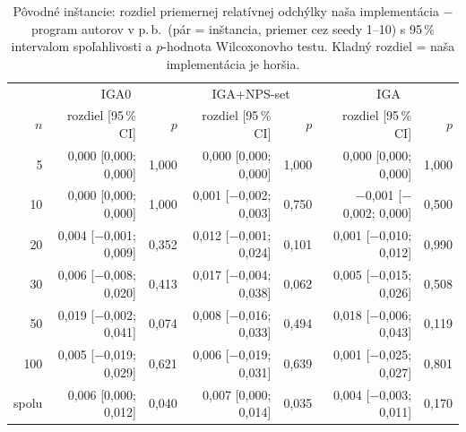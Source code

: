 \begin{table}[ht]
\centering
\scriptsize
\caption{Pôvodné inštancie: rozdiel priemernej relatívnej odchýlky naša implementácia $-$ program autorov v p.\,b.\ (pár = inštancia, priemer cez seedy 1--10) s 95\,\% intervalom spoľahlivosti a $p$-hodnota Wilcoxonovho testu. Kladný rozdiel = naša implementácia je horšia.}
\label{tab:orig_tests}
\begin{tabular}{r|rr|rr|rr}
\toprule
 & \multicolumn{2}{c|}{IGA0} & \multicolumn{2}{c|}{IGA+NPS-set} & \multicolumn{2}{c}{IGA} \\
$n$ & rozdiel [95\,\% CI] & $p$ & rozdiel [95\,\% CI] & $p$ & rozdiel [95\,\% CI] & $p$ \\
\midrule
5 & 0{,}000 [0{,}000; 0{,}000] & 1{,}000 & 0{,}000 [0{,}000; 0{,}000] & 1{,}000 & 0{,}000 [0{,}000; 0{,}000] & 1{,}000 \\
10 & 0{,}000 [0{,}000; 0{,}000] & 1{,}000 & 0{,}001 [$-$0{,}002; 0{,}003] & 0{,}750 & $-$0{,}001 [$-$0{,}002; 0{,}000] & 0{,}500 \\
20 & 0{,}004 [$-$0{,}001; 0{,}009] & 0{,}352 & 0{,}012 [$-$0{,}001; 0{,}024] & 0{,}101 & 0{,}001 [$-$0{,}010; 0{,}012] & 0{,}990 \\
30 & 0{,}006 [$-$0{,}008; 0{,}020] & 0{,}413 & 0{,}017 [$-$0{,}004; 0{,}038] & 0{,}062 & 0{,}005 [$-$0{,}015; 0{,}026] & 0{,}508 \\
50 & 0{,}019 [$-$0{,}002; 0{,}041] & 0{,}074 & 0{,}008 [$-$0{,}016; 0{,}033] & 0{,}494 & 0{,}018 [$-$0{,}006; 0{,}043] & 0{,}119 \\
100 & 0{,}005 [$-$0{,}019; 0{,}029] & 0{,}621 & 0{,}006 [$-$0{,}019; 0{,}031] & 0{,}639 & 0{,}001 [$-$0{,}025; 0{,}027] & 0{,}801 \\
\midrule
spolu & 0{,}006 [0{,}000; 0{,}012] & 0{,}040 & 0{,}007 [0{,}000; 0{,}014] & 0{,}035 & 0{,}004 [$-$0{,}003; 0{,}011] & 0{,}170 \\
\bottomrule
\end{tabular}
\end{table}
